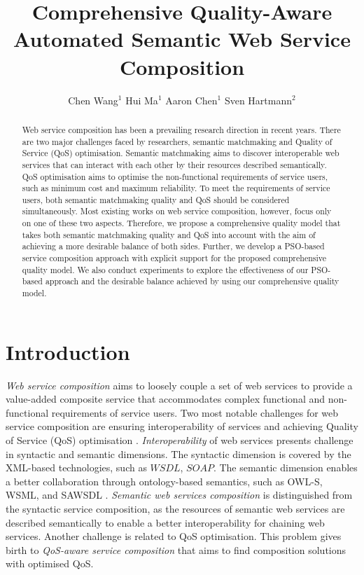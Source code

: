 \documentclass{llncs}
\title{Comprehensive Quality-Aware Automated Semantic Web Service Composition}
\author{Chen Wang$^1$ \quad Hui Ma$^1$ \quad Aaron Chen$^1$ \quad Sven Hartmann$^2$}
\institute{$^1$ School of Engineering and Computer Science, \\Victoria University of Wellington, New Zealand\\
  \{chen.wang, hui.ma, aaron.chen\}@ecs.vuw.ac.nz \\[1ex]
  $^2$ Department of Informatics, \\Clausthal University of Technology, Germany\\
   sven.hartmann@tu-clausthal.de}
\begin{document}
\maketitle
\vspace{-0.8cm}
\begin{abstract}
Web service composition has been a prevailing research direction in recent years. There are two major challenges faced by researchers, semantic matchmaking and Quality of Service (QoS) optimisation. Semantic matchmaking aims to discover interoperable web services that can interact with each other by their resources described semantically. QoS optimisation aims to optimise the non-functional requirements of service users, such as minimum cost and maximum reliability. To meet the requirements of service users, both semantic matchmaking quality and QoS should be considered simultaneously. Most existing works on web service composition, however, focus only on one of these two aspects. Therefore, we propose a comprehensive quality model that takes both semantic matchmaking quality and QoS into account with the aim of achieving a more desirable balance of both sides. Further, we develop a PSO-based service composition approach with explicit support for the proposed comprehensive quality model. We also conduct experiments to explore the effectiveness of our PSO-based approach and the desirable balance achieved by using our comprehensive quality model.

\end{abstract}
\vspace{-0.8cm}
\section{Introduction}\label{introduction}

\textit{Web service composition} aims to loosely couple a set of web services to provide a value-added composite service that accommodates complex functional and non-functional requirements of service users. 
Two most notable challenges for web service composition are ensuring interoperability of services and achieving Quality of Service (QoS) optimisation \cite{fensel2011semantic}. \textit{Interoperability} of web services presents challenge in syntactic and semantic dimensions. The syntactic dimension is covered by the XML-based technologies, such as $WSDL$, $SOAP$. The semantic dimension enables a better collaboration through ontology-based semantics, such as OWL-S, WSML, and SAWSDL \cite{petrie2016web}. \textit{Semantic web services composition} is distinguished from the syntactic service composition, as the resources of semantic web services are described semantically to enable a better interoperability for chaining web services. Another challenge is related to QoS optimisation. This problem gives birth to \textit{QoS-aware service composition} that aims to find composition solutions with optimised QoS.
\end{document}
